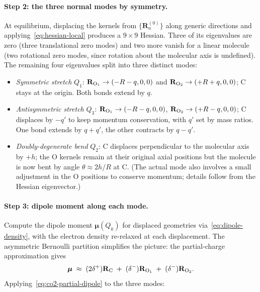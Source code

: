 \paragraph{Step 2: the three normal modes by symmetry.}
At equilibrium, displacing the kernels from $\{\mathbf{R}_a^{(0)}\}$ along generic directions and applying~\eqref{eq:hessian-local} produces a $9 \times 9$ Hessian. Three of its eigenvalues are zero (three translational zero modes) and two more vanish for a linear molecule (two rotational zero modes, since rotation about the molecular axis is undefined). The remaining four eigenvalues split into three distinct modes:

\begin{itemize}
\item \textit{Symmetric stretch} $Q_1$: $\mathbf{R}_{\rm O_1} \to (-R-q, 0, 0)$ and $\mathbf{R}_{\rm O_2} \to (+R+q, 0, 0)$; C stays at the origin. Both bonds extend by $q$.
\item \textit{Antisymmetric stretch} $Q_3$: $\mathbf{R}_{\rm O_1} \to (-R-q, 0, 0)$, $\mathbf{R}_{\rm O_2} \to (+R-q, 0, 0)$; C displaces by $-q'$ to keep momentum conservation, with $q'$ set by mass ratios. One bond extends by $q + q'$, the other contracts by $q - q'$.
\item \textit{Doubly-degenerate bend} $Q_2$: C displaces perpendicular to the molecular axis by $+h$; the O kernels remain at their original axial positions but the molecule is now bent by angle $\theta \approx 2h/R$ at C. (The actual mode also involves a small adjustment in the O positions to conserve momentum; details follow from the Hessian eigenvector.)
\end{itemize}

\paragraph{Step 3: dipole moment along each mode.}
Compute the dipole moment $\boldsymbol{\mu}(Q_k)$ for displaced geometries via~\eqref{eq:dipole-density}, with the electron density re-relaxed at each displacement. The asymmetric Bernoulli partition simplifies the picture: the partial-charge approximation gives
\begin{equation}\label{eq:co2-partial-dipole}
\boldsymbol{\mu} \;\approx\; (2\delta^+) \mathbf{R}_{\rm C} \;+\; (\delta^-)\mathbf{R}_{\rm O_1} \;+\; (\delta^-)\mathbf{R}_{\rm O_2}.
\end{equation}
Applying~\eqref{eq:co2-partial-dipole} to the three modes:

